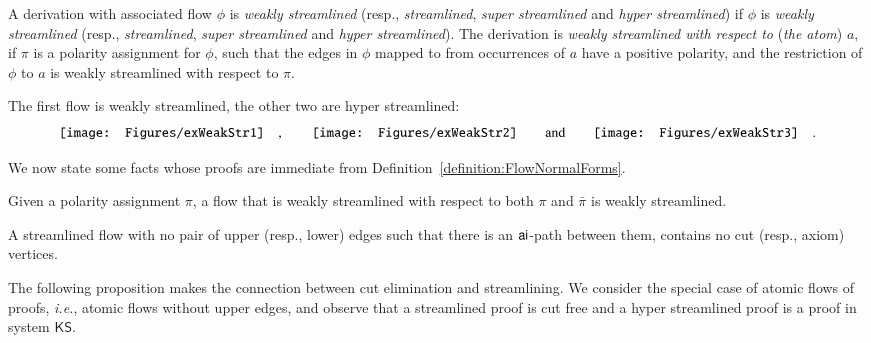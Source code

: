 \begin{definition}\label{definition:DerStreamlined}
A derivation with associated flow $\phi$ is \emph{weakly streamlined} (resp., \emph{streamlined}, \emph{super streamlined} and \emph{hyper streamlined}) if $\phi$ is \emph{weakly streamlined} (resp., \emph{streamlined}, \emph{super streamlined} and \emph{hyper streamlined}). The derivation is \emph{weakly streamlined with respect to} (\emph{the atom}) $a$, if $\pi$ is a polarity assignment for $\phi$, such that the edges in $\phi$ mapped to from occurrences of $a$ have a positive polarity, and the restriction of $\phi$ to $a$ is weakly streamlined with respect to $\pi$.
\end{definition}

\begin{example}\label{example:Streamlined}
The first flow is weakly streamlined, the other two are hyper streamlined:
\[
\vcenter{\hbox{\texttt{[image: Figures/exWeakStr1]}}}
\quad,\qquad
\vcenter{\hbox{\texttt{[image: Figures/exWeakStr2]}}}
\qquad\hbox{and}\qquad
\vcenter{\hbox{\texttt{[image: Figures/exWeakStr3]}}}
\quad.
\]
\end{example}

We now state some facts whose proofs are immediate from Definition~\vref{definition:FlowNormalForms}.

\begin{proposition}\label{proposition:FlowWeaklyStreamlinedPolarity}
Given a polarity assignment $\pi$, a flow that is weakly streamlined with respect to both $\pi$ and $\bar\pi$ is weakly streamlined. 
\end{proposition}

\begin{proposition}\label{proposition:FlowCutFree}
A streamlined flow with no pair of upper (resp., lower) edges such that there is an ${\mathsf{ai}}$-path between them, contains no cut (resp., axiom) vertices.
\end{proposition}

\newcommand{\KS}{\mathsf{KS}}
\TODO{$\KS$!}

The following proposition makes the connection between cut elimination and streamlining. We consider the special case of atomic flows of proofs, \emph{i.e.}, atomic flows without upper edges, and observe that a streamlined proof is cut free and a hyper streamlined proof is a proof in system $\KS$.


